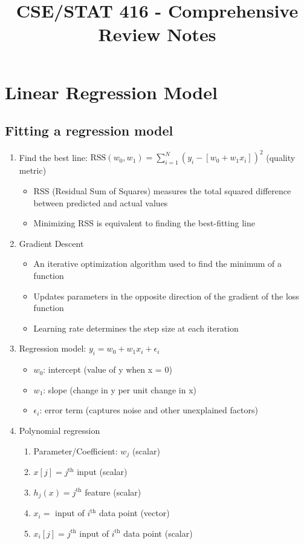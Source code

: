\documentclass{article}
\title{CSE/STAT 416 - Comprehensive Review Notes}
\author{}
\date{}
\begin{document}
\maketitle

\section{Linear Regression Model}

\subsection{Fitting a regression model}
\begin{enumerate}
    \item Find the best line: $\text{RSS}(w_0, w_1) = \sum_{i=1}^N (y_i - [w_0 + w_1x_i])^2$ (quality metric)
    \begin{itemize}
        \item RSS (Residual Sum of Squares) measures the total squared difference between predicted and actual values
        \item Minimizing RSS is equivalent to finding the best-fitting line
    \end{itemize}
    
    \item Gradient Descent
    \begin{itemize}
        \item An iterative optimization algorithm used to find the minimum of a function
        \item Updates parameters in the opposite direction of the gradient of the loss function
        \item Learning rate determines the step size at each iteration
    \end{itemize}
    
    \item Regression model: $y_i = w_0 + w_1x_i + \epsilon_i$ 
    \begin{itemize}
        \item $w_0$: intercept (value of y when x = 0)
        \item $w_1$: slope (change in y per unit change in x)
        \item $\epsilon_i$: error term (captures noise and other unexplained factors)
    \end{itemize}
    
    \item Polynomial regression
    \begin{enumerate}
        \item Parameter/Coefficient: $w_j$ (scalar)
        \item $x[j] = j^{\text{th}}$ input (scalar)
        \item $h_j(x) = j^{\text{th}}$ feature (scalar)
        \item $x_i = $ input of $i^{\text{th}}$ data point (vector)
        \item $x_i[j] = j^{\text{th}}$ input of $i^{\text{th}}$ data point (scalar)
    \end{enumerate}
    

\end{enumerate}
\end{document}
